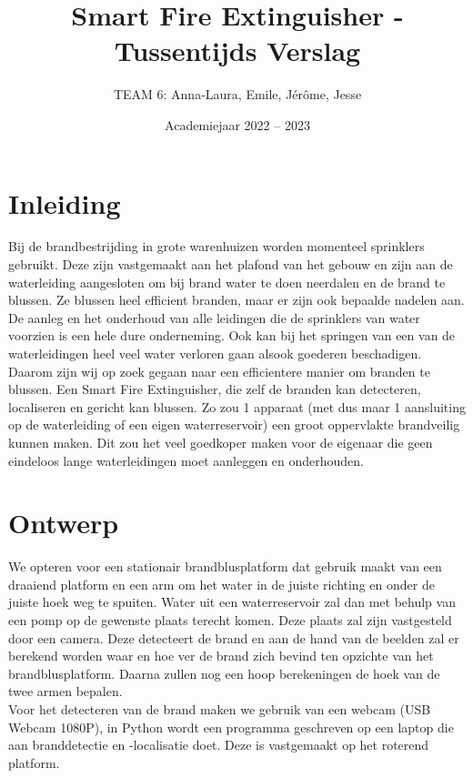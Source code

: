 \documentclass[kulak]{kulakarticle} %
\title{Smart Fire Extinguisher - Tussentijds Verslag}
\author{TEAM 6: Anna-Laura, Emile, Jérôme, Jesse}
\date{Academiejaar 2022 -- 2023}
\begin{document}
\maketitle

\section*{Inleiding}

Bij de brandbestrijding in grote warenhuizen worden momenteel sprinklers gebruikt. Deze zijn vastgemaakt aan het plafond van het gebouw en zijn aan de waterleiding aangesloten om bij brand water te doen neerdalen en de brand te blussen. Ze blussen heel efficient branden, maar er zijn ook bepaalde nadelen aan. De aanleg en het onderhoud van alle leidingen die de sprinklers van water voorzien is een hele dure onderneming. Ook kan bij het springen van een van de waterleidingen heel veel water verloren gaan alsook goederen beschadigen. \\

Daarom zijn wij op zoek gegaan naar een efficientere manier om branden te blussen. Een Smart Fire Extinguisher, die zelf de branden kan detecteren, localiseren en gericht kan blussen. Zo zou 1 apparaat (met dus maar 1 aansluiting op de waterleiding of een eigen waterreservoir) een groot oppervlakte brandveilig kunnen maken. Dit zou het veel goedkoper maken voor de eigenaar die geen eindeloos lange waterleidingen moet aanleggen en onderhouden.


\section{Ontwerp}

We opteren voor een stationair brandblusplatform dat gebruik maakt van een draaiend platform en een arm om het water in de juiste richting en onder de juiste hoek weg te spuiten. Water uit een waterreservoir zal dan met behulp van een pomp op de gewenste plaats terecht komen. Deze plaats zal zijn vastgesteld door een camera. Deze detecteert de brand en aan de hand van de beelden zal er berekend worden waar en hoe ver de brand zich bevind ten opzichte van het brandblusplatform. Daarna zullen nog een hoop berekeningen de hoek van de twee armen bepalen. \\

Voor het detecteren van de brand maken we gebruik van een webcam (USB Webcam 1080P), in Python wordt een programma geschreven op een laptop die aan branddetectie en -localisatie doet. Deze is vastgemaakt op het roterend platform. \\
\end{document}
